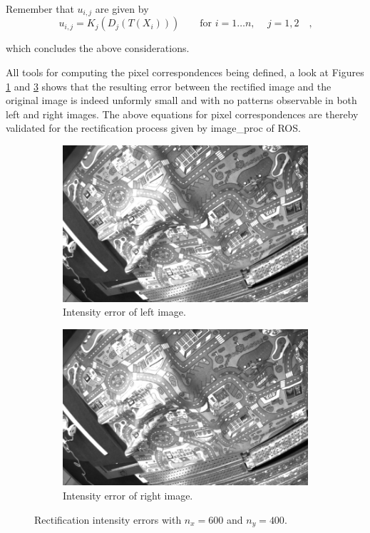 Remember that $u_{i,j}$ are given by 
\begin{equation}
  u_{i,j} = K_j (D_j(T(X_i))) 
  \hspace{2em} \text{for } i = 1 \ldots n \text{, } \hspace{1em} j = 1,2
  \hspace{1em}\text{,}
  \label{eqn/rect/u_def}
\end{equation}

which concludes the above considerations.

All tools for computing the pixel correspondences being defined, a look at 
Figures \ref{fig:rect_r1} and \ref{fig:rect_r2} shows that the resulting error
between the rectified image and the original image is indeed unformly 
small and with no patterns observable in both left and right images.
The above equations for pixel correspondences are thereby validated for the 
rectification process given by image\_proc of ROS.

\begin{figure}[h]
  \centering
  \begin{subfigure}[b]{0.49\textwidth}
    \includegraphics[width=\textwidth]{figures/rect_r1.jpg} 
    \caption{Intensity error of left image.} 
    \label{fig:rect_r1}
  \end{subfigure}
  \begin{subfigure}[b]{0.49\textwidth}
    \includegraphics[width=\textwidth]{figures/rect_r2.jpg} 
    \caption{Intensity error of right image.}
    \label{fig:rect_r2}
  \end{subfigure}
  \caption{Rectification intensity errors with $n_x = 600$ and $n_y = 400$.}
\end{figure}

